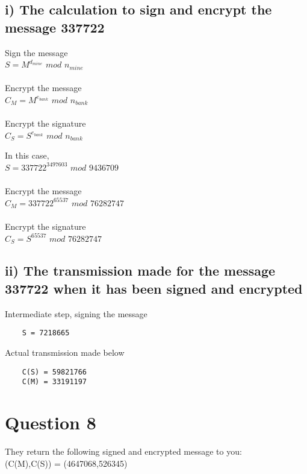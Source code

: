 \documentclass[a4paper,12pt]{article}
\begin{document}
\subsection*{i) The calculation to sign and encrypt the message 337722}
Sign the message\\
$S = M^{d_{mine}}$ $mod$ $n_{mine}$ \\ \\
Encrypt the message\\
$C_M = M^{e_{bank}}$ $mod$ $n_{bank}$\\\\
Encrypt the signature\\
$C_S = S^{e_{bank}}$ $mod$ $n_{bank}$\newpage

\noindent In this case,\\
$S = 337722^{3497603}$ $mod$ $9436709$ \\ \\
Encrypt the message\\
$C_M = 337722^{65537}$ $mod$ $76282747$\\\\
Encrypt the signature\\
$C_S = S^{65537}$ $mod$ $76282747$

\subsection*{ii) The transmission made for the message 337722 when it has been signed and encrypted}
Intermediate step, signing the message
\begin{verbatim}
    S = 7218665
\end{verbatim}
Actual transmission made below
\begin{verbatim}
    C(S) = 59821766
    C(M) = 33191197
\end{verbatim}


\section*{Question 8}
They return the following signed and encrypted message to you:\\
(C(M),C(S)) = (4647068,526345)
\end{document}
